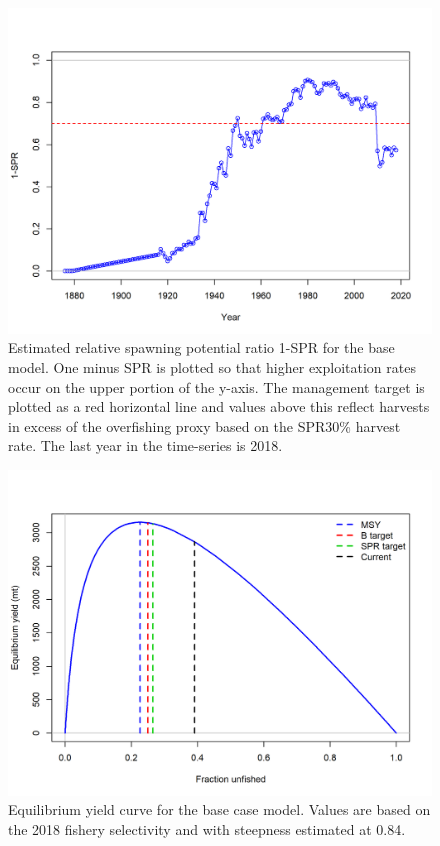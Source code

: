 \documentclass[12pt,]{article}
\begin{document}
\FloatBarrier

\begin{figure}
\centering
\includegraphics{r4ss/plots_mod1/SPR2_minusSPRseries.png}
\caption{Estimated relative spawning potential ratio 1-SPR for the base
model. One minus SPR is plotted so that higher exploitation rates occur
on the upper portion of the y-axis. The management target is plotted as
a red horizontal line and values above this reflect harvests in excess
of the overfishing proxy based on the SPR30\% harvest rate. The last
year in the time-series is 2018. \label{fig:SPR_all_fig}}
\end{figure}

\FloatBarrier

\begin{figure}
\centering
\includegraphics{r4ss/plots_mod1/yield2_yield_curve_with_refpoints.png}
\caption{Equilibrium yield curve for the base case model. Values are
based on the 2018 fishery selectivity and with steepness estimated at
0.84. \label{fig:yield}}
\end{figure}
\end{document}
